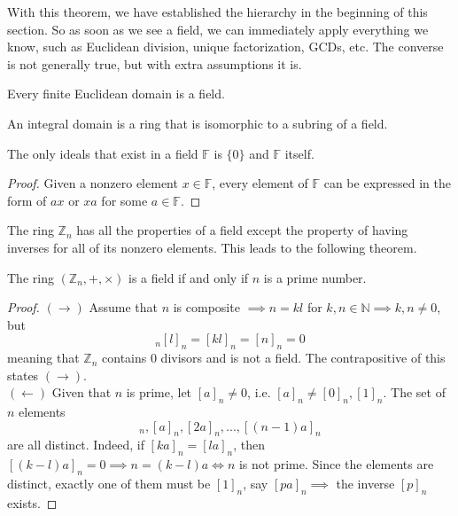   With this theorem, we have established the hierarchy in the beginning of this section. So as soon as we see a field, we can immediately apply everything we know, such as Euclidean division, unique factorization, GCDs, etc. The converse is not generally true, but with extra assumptions it is. 

  \begin{theorem}
    Every finite Euclidean domain is a field. 
  \end{theorem} 

  \begin{theorem}
    An integral domain is a ring that is isomorphic to a subring of a field. 
  \end{theorem}

  \begin{theorem}
    The only ideals that exist in a field $\mathbb{F}$ is $\{0\}$ and $\mathbb{F}$ itself. 
  \end{theorem}
  \begin{proof}
    Given a nonzero element $x \in \mathbb{F}$, every element of $\mathbb{F}$ can be expressed in the form of $a x$ or $x a$ for some $a \in \mathbb{F}$. 
  \end{proof}

  The ring $\mathbb{Z}_n$ has all the properties of a field except the property of having inverses for all of its nonzero elements. This leads to the following theorem. 

  \begin{theorem}
    The ring $(\mathbb{Z}_{n}, +, \times)$ is a field if and only if $n$ is a prime number. 
  \end{theorem}
  \begin{proof}
    $(\rightarrow)$ Assume that $n$ is composite $\implies n = k l$ for $k, n \in \mathbb{N} \implies k, n \neq 0$, but 
    \begin{equation}
      [k]_n [l]_n = [k l]_n = [n]_n = 0
    \end{equation}
    meaning that $\mathbb{Z}_n$ contains $0$ divisors and is not a field. The contrapositive of this states $(\rightarrow)$. \\
    $(\leftarrow)$ Given that $n$ is prime, let $[a]_n \neq 0$, i.e. $[a]_n \neq [0]_n, [1]_n$. The set of $n$ elements 
    \begin{equation}
      [0]_n, [a]_n, [2a]_n, ..., [(n-1)a]_n
    \end{equation}
    are all distinct. Indeed, if $[k a]_n = [l a]_n$, then $[(k-l) a]_n = 0 \implies n = (k-l) a \iff n$ is not prime. Since the elements are distinct, exactly one of them must be $[1]_n$, say $[p a]_n \implies$ the inverse $[p]_n$ exists. 
  \end{proof}

